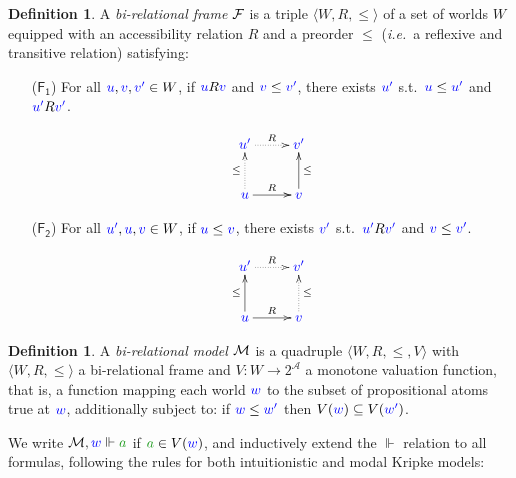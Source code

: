 \documentclass[a4paper]{article}
\theoremstyle{plain}
\theoremstyle{definition}
\newtheorem{definition}[theorem]{Definition}
\newcommand*{\fm}[1]{{\color{notgreen}{#1}}}
\newcommand*{\lb}[1]{{\color{blue}{#1}}}
\newcommand*{\accs}[2]{\lb{#1}R\lb{#2}}
\newcommand*{\futs}[2]{\lb{#1}\le{\color{blue}{#2}}}
\newcommand*{\rn}[1]  {\ensuremath{\mathsf{#1}}}
\newcommand*{\rel}{R}
\begin{document}
\begin{definition}
	A \emph{bi-relational frame} $\mathcal{F}$ is a triple $\langle W, \rel, \le \rangle$ 
	of a set of worlds $W$ equipped with an {accessibility relation} $\rel$ and a preorder $\le$ (\emph{i.e.}\ a reflexive and transitive relation) satisfying:
	\begin{enumerate}
		\item[($\rn{F_1}$)] For all $\lb u, \lb v, \lb{v'} \in W$, if $\accs uv$ and $\futs v{v'}$, there exists $\lb{u'}$ s.t.~$\futs u{u'}$ and $\accs{u'}{v'}$.
		
		\begin{equation*}
		\xymatrix{
			\lb{u'} \ar@{.>}[r]^R  & \lb{v'} \\
			\lb u \ar@{.>}[u]^{\le} \ar@{->}[r]^R  & \lb v \ar@{->}[u]_{\le}
		}
		\end{equation*}
		
		\item[($\rn{F_2}$)] For all $\lb {u'}, \lb u, \lb v \in W$, if $\futs uv$, there exists $\lb {v'}$ s.t.~$\accs{u'}{v'}$ and $\futs v{v'}$.
		
		\begin{equation*}
		\xymatrix{
			\lb{u'} \ar@{.>}[r]^R & \lb{v'} \\
			\lb u \ar@{->}[u]^{\le} \ar@{->}[r]^R & \lb v \ar@{.>}[u]_{\le}
		}
		\end{equation*}
	\end{enumerate}
\end{definition}

\begin{definition}
	\label{model}
	A \emph{bi-relational model} $\mathcal{M}$ is a quadruple $\langle W, \rel,\le,V \rangle$ with $\langle W, \rel, \le \rangle$ a bi-relational frame and $V\colon W \to 2^\mathcal{A}$ a monotone valuation function, that is, a function mapping each world $\lb w$ to the subset of propositional atoms true at $\lb w$, additionally subject to:
	if $\lb w \le \lb{w'}$ then $V(\lb w)\subseteq V(\lb{w'})$.
\end{definition}

We write $\M, \lb w \Vdash \fm a$ if $\fm a \in V(\lb w)$, and inductively extend the $\Vdash$ relation to all formulas, following the rules for both intuitionistic and modal Kripke models:
\end{document}
